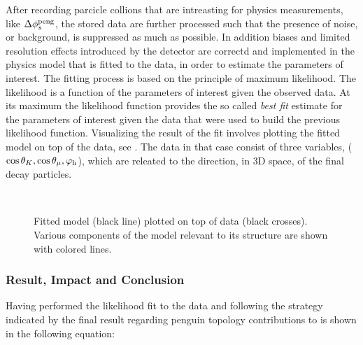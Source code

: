 After recording parcicle collions that are intreasting for physics measurements, like $\Delta\phi_{s}^{\tiny\text{peng}}$,
the stored data are further processed such that the presence of noise, or background, is suppressed as much
as possible. In addition biases and limited resolution effects introduced by the detector are correctd and
implemented in the physics model that is fitted to the data, in order to estimate the parameters of interest.
The fitting process is based on the principle of maximum likelihood. The likelihood is a
function of the parameters of interest given the observed data. At its maximum the likelihood function
provides the so called {\it best fit} estimate for the parameters of interest given the data that were
used to build the previous likelihood function. Visualizing the result of the fit involves
plotting the fitted model on top of the data, see .
The data in that case consist of three variables, ($\cos\theta_{K}, \cos\theta_{\mu}, \varphi_{\rm h}$), which are
releated to the direction, in 3D space, of the \BsJpsiPhi final decay particles.

\begin{figure}[!t]
  \begin{subfigure}{0.5\textwidth}
    \centering
    \scalebox{1.2}{}
  \end{subfigure}%
  \hfill
  \begin{subfigure}{0.5\textwidth}
    \centering
    \scalebox{1.2}{}
  \end{subfigure}\\
  \begin{subfigure}{\textwidth}
    \centering
    \scalebox{1.2}{}
  \end{subfigure}
  \caption{Fitted model (black line) plotted on top of \BsJpsiKst data (black crosses).
           Various components of the model relevant to its \CP structure are shown with colored lines.}
  \label{app_angular_plot_thetas}
\end{figure}

\subsubsection{Result, Impact and Conclusion}

Having performed the likelihood fit to the data and
following the strategy indicated by \cite{Fleischer:1999zi,Faller:2008gt,DeBruyn:2014oga,DeBruyn-thesis}
the final result regarding penguin topology contributions to \phis is shown in the following equation:

